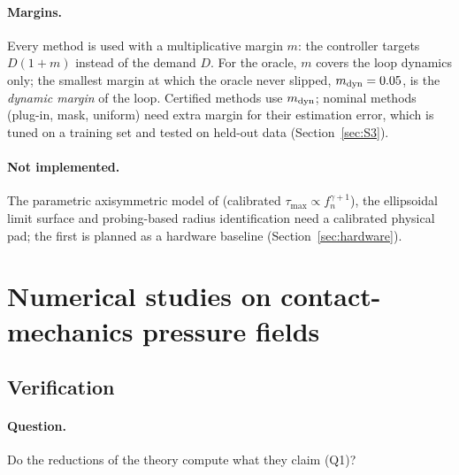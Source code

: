 \documentclass[11pt,a4paper]{article}
\begin{document}
\paragraph{Margins.} Every method is used with a multiplicative margin $m$: the controller targets $D(1+m)$ instead of the demand $D$. For the
oracle, $m$ covers the loop dynamics only; the smallest margin at which the oracle never slipped, $m_{\rm dyn}=0.05$, is the \emph{dynamic margin}
of the loop. Certified methods use $m_{\rm dyn}$; nominal methods (plug-in, mask, uniform) need extra margin for their estimation error, which is
tuned on a training set and tested on held-out data (Section~\ref{sec:S3}).

\paragraph{Not implemented.} The parametric axisymmetric model of \citet{costanzo2020two} (calibrated $\tau_{\max}\propto f_n^{\gamma+1}$), the
ellipsoidal limit surface \citep{howe1996practical,xydas1999modeling} and probing-based radius identification \citep{arslan2025inhand} need a
calibrated physical pad; the first is planned as a hardware baseline (Section~\ref{sec:hardware}).

\section{Numerical studies on contact-mechanics pressure fields}
\label{sec:numerics}

\subsection{Verification}
\label{sec:verification}
\paragraph{Question.} Do the reductions of the theory compute what they claim (Q1)?
\end{document}
